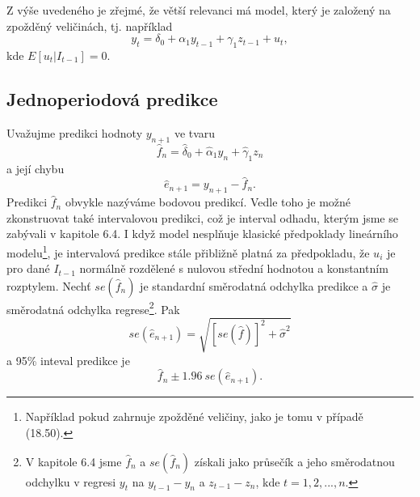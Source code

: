 Z výše uvedeného je zřejmé, že větší relevanci má model, který je založený na zpožděný veličinách, tj. například
\begin{equation}
y_t = \delta_0 + \alpha_1 y_{t - 1} + \gamma_1 z_{t - 1} + u_t,
\end{equation}
kde $E[u_t | I_{t - 1}] = 0$.

\subsection{Jednoperiodová predikce}

Uvažujme predikci hodnoty $y_{n+1}$ ve tvaru
\begin{equation}
\hat{f}_n = \hat{\delta}_0 + \hat{\alpha}_1 y_n + \hat{\gamma}_1 z_n
\end{equation}
a její chybu
\begin{equation}
\hat{e}_{n + 1} = y_{n + 1} - \hat{f}_n.
\end{equation}
Predikci $\hat{f}_n$ obvykle nazýváme bodovou predikcí. Vedle toho je možné zkonstruovat také intervalovou 
predikci, což je interval odhadu, kterým jsme se zabývali v kapitole 6.4. I když model nesplňuje 
klasické předpoklady lineárního modelu\footnote{Například pokud zahrnuje zpožděné veličiny, jako je tomu v případě 
(18.50).}, je intervalová predikce stále přibližně platná za předpokladu, že $u_i$ je pro dané $I_{t - 1}$ 
normálně rozdělené s nulovou střední hodnotou a konstantním rozptylem. Nechť $se(\hat{f}_n)$ je standardní 
směrodatná odchylka predikce a $\hat{\sigma}$ je směrodatná odchylka regrese\footnote{V kapitole 6.4 jsme 
$\hat{f}_n$ a $se(\hat{f}_n)$ získali jako průsečík a jeho směrodatnou odchylku v regresi $y_t$ na $y_{t - 1} - 
y_n$ a $z_{t - 1} - z_n$, kde $t = 1, 2, ..., n$.}. Pak
\begin{equation}
se(\hat{e}_{n + 1}) = \sqrt{[se(\hat{f})]^2 + \hat{\sigma}^2}
\end{equation}
a 95\% inteval predikce je
\begin{equation}
\hat{f}_n \pm 1.96 ~ se(\hat{e}_{n + 1}).
\end{equation}

